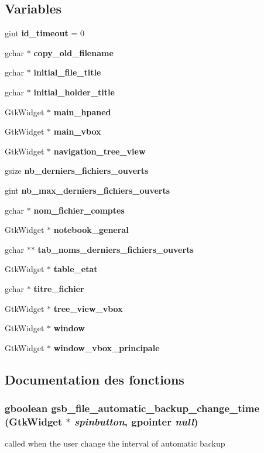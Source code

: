 \subsection*{Variables}
\begin{DoxyCompactItemize}
\item 
gint {\bf id\_\-timeout} = 0
\item 
gchar $\ast$ {\bf copy\_\-old\_\-filename}
\item 
gchar $\ast$ {\bf initial\_\-file\_\-title}
\item 
gchar $\ast$ {\bf initial\_\-holder\_\-title}
\item 
GtkWidget $\ast$ {\bf main\_\-hpaned}
\item 
GtkWidget $\ast$ {\bf main\_\-vbox}
\item 
GtkWidget $\ast$ {\bf navigation\_\-tree\_\-view}
\item 
gsize {\bf nb\_\-derniers\_\-fichiers\_\-ouverts}
\item 
gint {\bf nb\_\-max\_\-derniers\_\-fichiers\_\-ouverts}
\item 
gchar $\ast$ {\bf nom\_\-fichier\_\-comptes}
\item 
GtkWidget $\ast$ {\bf notebook\_\-general}
\item 
gchar $\ast$$\ast$ {\bf tab\_\-noms\_\-derniers\_\-fichiers\_\-ouverts}
\item 
GtkWidget $\ast$ {\bf table\_\-etat}
\item 
gchar $\ast$ {\bf titre\_\-fichier}
\item 
GtkWidget $\ast$ {\bf tree\_\-view\_\-vbox}
\item 
GtkWidget $\ast$ {\bf window}
\item 
GtkWidget $\ast$ {\bf window\_\-vbox\_\-principale}
\end{DoxyCompactItemize}


\subsection{Documentation des fonctions}
\subsubsection[{gsb\_\-file\_\-automatic\_\-backup\_\-change\_\-time}]{\setlength{\rightskip}{0pt plus 5cm}gboolean gsb\_\-file\_\-automatic\_\-backup\_\-change\_\-time (GtkWidget $\ast$ {\em spinbutton}, \/  gpointer {\em null})}\label{gsb__file_8c_acad35e7f7cc1f9be4d8de4a0c391e25d}
called when the user change the interval of automatic backup


